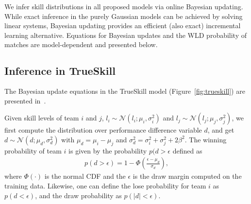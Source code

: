 \label{sec:inference}

We infer skill distributions in all proposed models via
online Bayesian updating.  While exact inference in the purely Gaussian
models can be achieved by solving linear systems, Bayesian
updating provides an efficient (also exact) incremental learning alternative.
Equations for Bayesian updates and the WLD probability of matches are
model-dependent and presented below.

\subsection{Inference in TrueSkill}

The Bayesian update equations in the TrueSkill model
(Figure~\ref{fig:trueskill}) are presented
in~\cite{herbrich06569}.

 Given skill levels of
team $i$ and $j$, $l_i\sim\mathcal{N}(l_i;\mu_i,\sigma_i^2)$ and
$l_j\sim\mathcal{N}(l_j;\mu_j,\sigma_j^2)$, we first compute the
distribution over performance difference variable $d$, and get
$d\sim\mathcal{N}(d;\mu_d,\sigma_d^2)$ with $\mu_d = \mu_i - \mu_j$
and $\sigma_d^2 = \sigma_i^2 + \sigma_j^2+2\beta^2$. The winning
probability of team $i$ is given by the probability $p(d>\epsilon$ defined as
\begin{align}
  p(d>\epsilon) = 1 - \Phi\left(\frac{\epsilon-\mu_d}{\sigma_d}\right),
\end{align}
where $\Phi(\cdot)$ is the normal CDF and the $\epsilon$ is the draw margin computed on the training data. Likewise, one can define the lose probability for team $i$ as $p(d<\epsilon)$, and the draw probability as $p(|d|<\epsilon)$.

%

